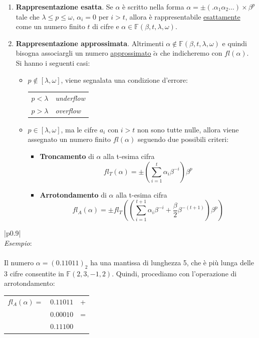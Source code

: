 \documentclass{article}
\newenvironment{example}
{\begin{center}
        \begin{tabular}{|p{0.9\textwidth}|}
            \hline \\ 
            \textit{Esempio}: \\\\ 
        }
        {
            \\\\ \hline
        \end{tabular}
    \end{center}
}
\begin{document}
\begin{enumerate}
    \item \textbf{Rappresentazione esatta}. Se $\alpha$ è scritto nella forma
        $\alpha=\pm(.\alpha_1\alpha_2\ldots)\times\beta^{p}$ tale che
        $\lambda\leq p\leq\omega$, $\alpha_i=0$ per $i> t$, allora è
        rappresentabile \underline{esattamente} come un numero finito $t$ di
        cifre e $\alpha\in \mathbb{F}(\beta,t,\lambda,\omega)$.
    \item \textbf{Rappresentazione approssimata}. Altrimenti 
        $\alpha\notin \mathbb{F}(\beta,t,\lambda,\omega)$ e quindi
        bisogna associargli un numero \underline{approssimato} $\tilde\alpha$
        che indicheremo con $fl(\alpha)$. Si hanno i seguenti casi:
        \begin{itemize}
            \item $p\notin[\lambda,\omega]$, viene segnalata una condizione
                d'errore:
                \begin{center}
                    \begin{tabular}{ll}
                        $p<\lambda$ & \textit{underflow} \\ 
                        $p>\lambda$ & \textit{overflow} \\ 
                   \end{tabular} 
                \end{center}
            \item $p\in[\lambda,\omega]$, ma le cifre $a_i$ con $i>t$ non sono
                tutte nulle, allora viene assegnato un numero finito $fl(\alpha)$
                seguendo due possibili criteri:
                \begin{itemize}
                    \item\textbf{Troncamento} di $\alpha$ alla t-esima cifra
                        $$fl_{T}(\alpha)=\pm(\sum_{i=1}^{t}\alpha_i\beta^{-i})\beta^p$$
                    \item\textbf{Arrotondamento} di $\alpha$ alla t-esima cifra 
                        $$fl_{A}(\alpha)=\pm
                        fl_{T}((\sum_{i=1}^{t+1}\alpha_i\beta^{-i}+\frac{\beta}{2}\beta^{-(t+1)})\beta^p)$$
                \end{itemize}
        \end{itemize}
\end{enumerate}
\begin{example}
    Il numero $\alpha=(0.11011)_2$ ha una mantissa di lunghezza 5, che è più
    lunga delle 3 cifre consentite in $\mathbb{F}(2,3,-1,2)$. Quindi, procediamo
    con l'operazione di arrotondamento:
    \begin{center}
       \begin{tabular}{lll}
           $fl_{A}(\alpha)=$ & $0.11011$ & + \\ 
                        & $0.00010$ & = \\ 
                        \hline
                        & $0.11100$ & \\ 
       \end{tabular} 
    \end{center}
\end{example}
\end{document}

